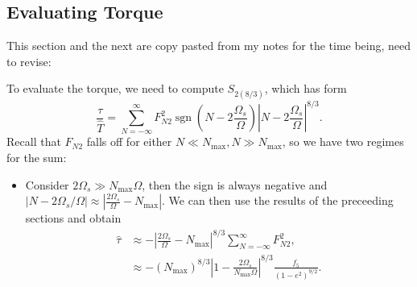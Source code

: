 \documentclass[
        fleqn,
        usenatbib,
        referee,
    ]{mnras}
\newcommand*{\abs}[1]{\left|#1\right|}
\newcommand*{\p}[1]{\left(#1\right)}
\DeclareMathOperator*{\sgn}{sgn}
\begin{document}
\subsection{Evaluating Torque}

This section and the next are copy pasted from my notes for the time being, need
to revise:

To evaluate the torque, we need to compute $S_{2(8/3)}$, which has form
\begin{equation}
    \frac{\tau}{\hat{T}} = \sum\limits_{N = -\infty}^\infty
        F_{N2}^2 \sgn\p{N - 2\frac{\Omega_s}{\Omega}}
            \abs{N - 2\frac{\Omega_s}{\Omega}}^{8/3}.
\end{equation}
Recall that $F_{N2}$ falls off for either $N \ll N_{\max}, N \gg N_{\max}$, so
we have two regimes for the sum:
\begin{itemize}
    \item Consider $2\Omega_s \gg N_{\max}\Omega$, then the sign is always
        negative and $\abs{N - 2\Omega_s/\Omega} \approx
        \abs{\frac{2\Omega_s}{\Omega} - N_{\max}}$. We can then use the results
        of the preceeding sections and obtain
        \begin{align}
            \hat{\tau}
                &\approx -\abs{\frac{2\Omega_s}{\Omega} - N_{\max}}^{8/3}
                    \sum\limits_{N = -\infty}^\infty F_{N2}^2,\\
                &\approx -\p{N_{\max}}^{8/3}
                    \abs{1 - \frac{2\Omega_s}{N_{\max}\Omega}}^{8/3}
                    \frac{f_5}{\p{1 - e^2}^{9/2}}.
        \end{align}


\end{itemize}
\end{document}

